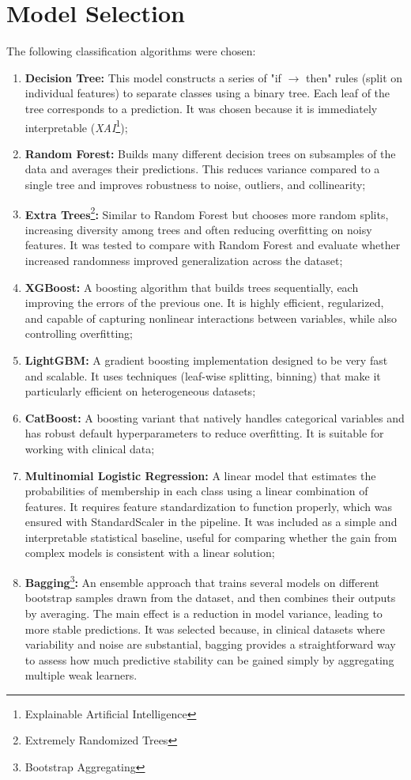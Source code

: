 \section{Model Selection}
The following classification algorithms were chosen:
\begin{enumerate}
	\item \textbf{Decision Tree:} This model constructs a series of "if $\to$ then" rules (split on individual features) to separate classes using a binary tree. Each leaf of the tree corresponds to a prediction. It was chosen because it is immediately interpretable (\textit{XAI}\footnote{Explainable Artificial Intelligence});
	\item \textbf{Random Forest:} Builds many different decision trees on subsamples of the data and averages their predictions. This reduces variance compared to a single tree and improves robustness to noise, outliers, and collinearity;
	\item \textbf{Extra Trees}\footnote{Extremely Randomized Trees}\textbf{:} Similar to Random Forest but chooses more random splits, increasing diversity among trees and often reducing overfitting on noisy features. It was tested to compare with Random Forest and evaluate whether increased randomness improved generalization across the dataset;
	\item \textbf{XGBoost:} A boosting algorithm that builds trees sequentially, each improving the errors of the previous one. It is highly efficient, regularized, and capable of capturing nonlinear interactions between variables, while also controlling overfitting;
	\item \textbf{LightGBM:} A gradient boosting implementation designed to be very fast and scalable. It uses techniques (leaf-wise splitting, binning) that make it particularly efficient on heterogeneous datasets;
	\item \textbf{CatBoost:} A boosting variant that natively handles categorical variables and has robust default hyperparameters to reduce overfitting. It is suitable for working with clinical data;
	\item \textbf{Multinomial Logistic Regression:} A linear model that estimates the probabilities of membership in each class using a linear combination of features. It requires feature standardization to function properly, which was ensured with StandardScaler in the pipeline. It was included as a simple and interpretable statistical baseline, useful for comparing whether the gain from complex models is consistent with a linear solution;
	\item \textbf{Bagging}\footnote{Bootstrap Aggregating}\textbf{:} An ensemble approach that trains several models on different bootstrap samples drawn from the dataset, and then combines their outputs by averaging. The main effect is a reduction in model variance, leading to more stable predictions. It was selected because, in clinical datasets where variability and noise are substantial, bagging provides a straightforward way to assess how much predictive stability can be gained simply by aggregating multiple weak learners.
\end{enumerate}

\vspace{2mm}